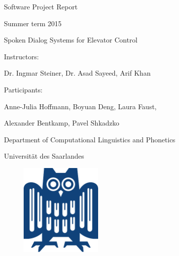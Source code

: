 
\begin{center} Software Project Report \end{center}
\begin{center} Summer term 2015 \end{center}
\hspace{1cm}
\begin{center}\Large{Spoken Dialog Systems for Elevator Control} \end{center}
\hspace{1cm}

\begin{center}Instructors:\end{center}
\begin{center}
Dr. Ingmar Steiner, Dr. Asad Sayeed, Arif Khan 
\end{center}

\vfill

\begin{center} Participants: \end{center}
\begin{center}
Anne-Julia Hoffmann, Boyuan Deng, Laura Faust, 
\end{center}
\begin{center}
Alexander Bentkamp, Pavel Shkadzko 
\end{center}

\vfill
\vfill

\begin{center} Department of Computational Linguistics and Phonetics \end{center}
\begin{center} Universität des Saarlandes \end{center}
\vfill
\begin{figure}[ht]
\begin{center}
  \includegraphics[width=4.0cm]{logo_uds.pdf}
\end{center}
\end{figure}
\vfill
\vfill
